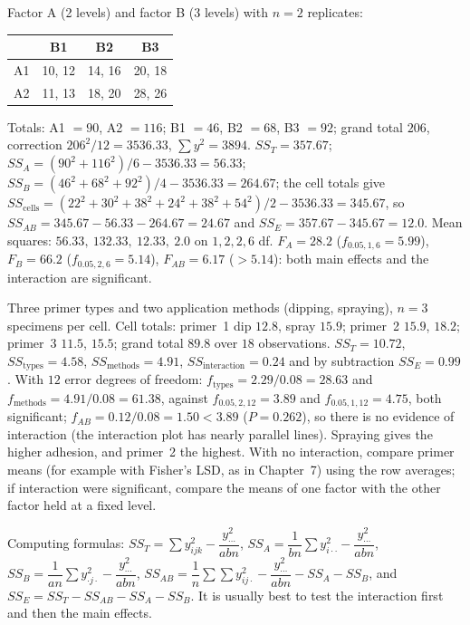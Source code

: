 \begin{example}\label{ex:two-factor}
Factor A (2 levels) and factor B (3 levels) with $n=2$ replicates:
\begin{center}
\begin{tabular}{lccc}
\toprule
 & B1 & B2 & B3\\
\midrule
A1 & 10, 12 & 14, 16 & 20, 18\\
A2 & 11, 13 & 18, 20 & 28, 26\\
\bottomrule
\end{tabular}
\end{center}
Totals: A1 $=90$, A2 $=116$; B1 $=46$, B2 $=68$, B3 $=92$; grand total $206$, correction $206^2/12=3536.33$, $\sum y^2=3894$. $SS_T=357.67$; $SS_A=(90^2+116^2)/6-3536.33=56.33$; $SS_B=(46^2+68^2+92^2)/4-3536.33=264.67$; the cell totals give $SS_{\mathrm{cells}}=(22^2+30^2+38^2+24^2+38^2+54^2)/2-3536.33=345.67$, so $SS_{AB}=345.67-56.33-264.67=24.67$ and $SS_E=357.67-345.67=12.0$. Mean squares: $56.33,\ 132.33,\ 12.33,\ 2.0$ on $1,2,2,6$ df. $F_A=28.2$ ($f_{0.05,1,6}=5.99$), $F_B=66.2$ ($f_{0.05,2,6}=5.14$), $F_{AB}=6.17$ ($>5.14$): both main effects and the interaction are significant.
\end{example}

\begin{example}\label{ex:primer}
Three primer types and two application methods (dipping, spraying), $n=3$ specimens per cell. Cell totals: primer~1 dip $12.8$, spray $15.9$; primer~2 $15.9$, $18.2$; primer~3 $11.5$, $15.5$; grand total $89.8$ over $18$ observations. $SS_T=10.72$, $SS_{\text{types}}=4.58$, $SS_{\text{methods}}=4.91$, $SS_{\text{interaction}}=0.24$ and by subtraction $SS_E=0.99$. With $12$ error degrees of freedom: $f_{\text{types}}=2.29/0.08=28.63$ and $f_{\text{methods}}=4.91/0.08=61.38$, against $f_{0.05,2,12}=3.89$ and $f_{0.05,1,12}=4.75$, both significant; $f_{AB}=0.12/0.08=1.50<3.89$ ($P=0.262$), so there is no evidence of interaction (the interaction plot has nearly parallel lines). Spraying gives the higher adhesion, and primer~2 the highest. With no interaction, compare primer means (for example with Fisher's LSD, as in Chapter~7) using the row averages; if interaction were significant, compare the means of one factor with the other factor held at a fixed level.
\end{example}

Computing formulas: $SS_T=\sum y_{ijk}^2-\dfrac{y_{\cdots}^2}{abn}$, $SS_A=\dfrac1{bn}\sum y_{i\cdot\cdot}^2-\dfrac{y_{\cdots}^2}{abn}$, $SS_B=\dfrac1{an}\sum y_{\cdot j\cdot}^2-\dfrac{y_{\cdots}^2}{abn}$, $SS_{AB}=\dfrac1n\sum\sum y_{ij\cdot}^2-\dfrac{y_{\cdots}^2}{abn}-SS_A-SS_B$, and $SS_E=SS_T-SS_{AB}-SS_A-SS_B$. It is usually best to test the interaction first and then the main effects.

